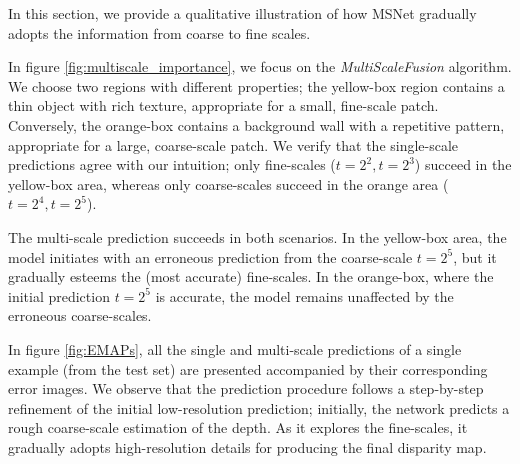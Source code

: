 \documentclass[runningheads]{llncs}
\begin{document}
In this section, we provide a qualitative illustration of how MSNet gradually adopts the information from coarse to fine scales.

In figure \ref{fig:multiscale_importance}, we focus on the \textit{MultiScaleFusion} algorithm. We choose two regions with different properties; the yellow-box region contains a thin object with rich texture, appropriate for a small, fine-scale patch. Conversely, the orange-box contains a background wall with a repetitive pattern, appropriate for a large, coarse-scale patch. We verify that the single-scale predictions agree with our intuition; only fine-scales ($t=2^2, t = 2^3$) succeed in the yellow-box area, whereas only coarse-scales succeed in the orange area ($t =2^4, t=2^5$). 

The multi-scale prediction succeeds in both scenarios. In the yellow-box area, the model initiates with an erroneous prediction from the coarse-scale $t=2^5$, but it gradually esteems the (most accurate) fine-scales. In the orange-box, where the initial prediction $t=2^5$ is accurate, the model remains unaffected by the erroneous coarse-scales. 

In figure \ref{fig:EMAPs}, all the single and multi-scale predictions of a single example (from the test set) are presented accompanied by their corresponding error images. We observe that the prediction procedure follows a step-by-step refinement of the initial low-resolution prediction; initially, the network predicts a rough coarse-scale estimation of the depth. As it explores the fine-scales, it gradually adopts high-resolution details for producing the final disparity map.
\end{document}
